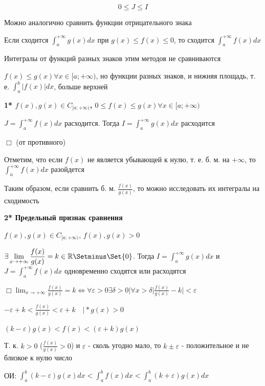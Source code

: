 \documentclass[12pt]{article}
\begin{document}
    \[0 \leq J \leq I\]

    \Nota Можно аналогично сравнить функции отрицательного знака

    Если сходится $\displaystyle \int^{+\infty}_{a} g(x) dx$ при $g(x) \leq f(x) \leq 0$, то сходится $\displaystyle \int^{+\infty}_{a} f(x) dx$

    Интегралы от функций разных знаков этим методов не сравниваются

    $f(x) \leq g(x) \forall x \in [a;+\infty)$, но функции разных знаков, и нижняя площадь, т. е. $\displaystyle \int^{b}_{a} |f(x)| dx$, больше верхней

    \textbf{1* $f(x), g(x) \in C_{[a;+\infty)}$, $0 \leq f(x) \leq g(x) \forall x \in [a;+\infty)$}

    $\displaystyle J = \int^{+\infty}_{a} f(x) dx \text{  расходится. Тогда  } I = \int^{+\infty}_{a} g(x) dx \text{  расходится}$

    $\Box$ \Lab (от противного)

    \Nota Отметим, что если $f(x)$ не является убывающей к нулю, т. е. б. м. на $+\infty$, то $\displaystyle \int^{+\infty}_{a} f(x) dx$ разойдется

    Таким образом, если сравнить б. м. $\displaystyle \frac{f(x)}{g(x)}$, то можно исследовать их интегралы на сходимость

    \textbf{2* Предельный признак сравнения}

    $f(x), g(x) \in C_{[a;+\infty)}$, $f(x), g(x) > 0$

    $\displaystyle \exists \lim_{x\to+\infty} \frac{f(x)}{g(x)} = k \in \Real \Setminus \Set{0}$.
    Тогда $\displaystyle I = \int^{+\infty}_{a} g(x)dx$ и $\displaystyle J = \int^{+\infty}_{a} f(x)dx$ одновременно сходятся или расходятся

    $\displaystyle \Box \lim_{x\to+\infty} \frac{f(x)}{g(x)} = k \Longleftrightarrow \forall \varepsilon > 0 \exists \delta > 0 | \forall x > \delta |\frac{f(x)}{g(x)} - k| < \varepsilon $

    $\displaystyle -\varepsilon + k < \frac{f(x)}{g(x)} < \varepsilon + k \quad \Big| * g(x) > 0$

    $\displaystyle (k - \varepsilon)g(x) < f(x) < (\varepsilon + k)g(x)$

    Т. к. $k > 0$ ($\frac{f(x)}{g(x)} > 0$) и $\varepsilon$ - сколь угодно мало, то $k \pm \varepsilon$ - положительное и не близкое к нулю число

    ОИ: $\displaystyle \int^{b}_{a} (k - \varepsilon)g(x) dx < \int^{b}_{a} f(x) dx < \int^{b}_{a} (k + \varepsilon)g(x) dx$
\end{document}
